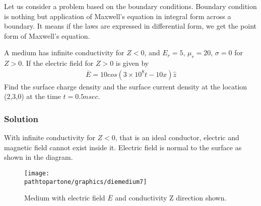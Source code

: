 Let us consider a problem based on the boundary conditions. Boundary condition is nothing but application of Maxwell's equation in integral form across a boundary. It means if the laws are expressed in differential form, we get the point form of Maxwell's equation.
\begin{exmp}
A medium has infinite conductivity for $Z<0$, and $E_r=5$, $\mu_r = 20$, $\sigma = 0$ for $Z>0$. If the electric field for $Z>0$ is given by 
\begin{align*}
\overline{E} = 10cos(3\times 10^8t - 10x)\hat{z}
\end{align*}
Find the surface charge density and the surface current density at the location (2,3,0) at the time $t = 0.5nsec$.\\
\subsubsection*{Solution}
With infinite conductivity for $Z<0$, that is an ideal conductor, electric and magnetic field cannot exist inside it. Electric field is normal to the surface as shown in the diagram.
\begin{figure}[h]
\centering
\texttt{[image: \\pathtopartone/graphics/diemedium7]}
\caption{Medium with electric field $\overline{E}$ and conductivity Z direction shown.}
\end{figure}


\end{exmp}
